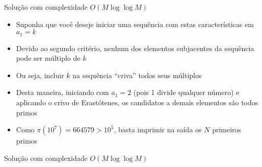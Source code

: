 \begin{frame}[fragile]{Solução com complexidade $O(M\log \log M)$}

    \begin{itemize}
        \item Suponha que você deseje iniciar uma sequência com estas características em $a_1 = k$

        \item Devido ao segundo critério, nenhum dos elementos subjacentes da sequência pode ser 
            múltiplo de $k$

        \item Ou seja, incluir $k$ na sequência ``criva'' todos seus múltiplos

        \item Desta maneira, iniciando com $a_1 = 2$ (pois 1 divide qualquer número) e aplicando
            o crivo de Erastótenes, os candidatos a demais elementos são todos primos

        \item Como $\pi(10^7) = 664579 > 10^5$, basta imprimir na saída os $N$ primeiros primos
    \end{itemize}

\end{frame}

\begin{frame}[fragile]{Solução com complexidade $O(M\log \log M)$}
\end{frame}
